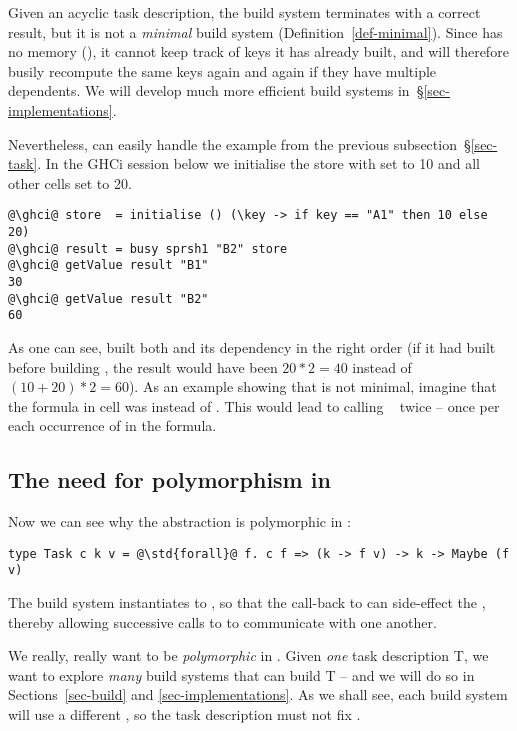 Given an acyclic task description, the  build system terminates with a
correct result, but it is not a \emph{minimal} build system
(Definition~\ref{def-minimal}). Since  has no memory (), it
cannot keep track of keys it has already built, and will therefore busily
recompute the same keys again and again if they have multiple dependents. We
will develop much more efficient build systems in~\S\ref{sec-implementations}.

Nevertheless,  can easily handle the example 
from the previous subsection~\S\ref{sec-task}. In the GHCi session below we
initialise the store with  set to 10 and all other cells set to 20.

\begin{verbatim}
@\ghci@ store  = initialise () (\key -> if key == "A1" then 10 else 20)
@\ghci@ result = busy sprsh1 "B2" store
@\ghci@ getValue result "B1"
30
@\ghci@ getValue result "B2"
60
\end{verbatim}

\noindent
As one can see,  built both  and its dependency  in the
right order (if it had built  before building , the result would
have been $20 * 2 = 40$ instead of $(10 + 20) * 2 = 60$). As an example showing
that  is not minimal, imagine that the formula in cell  was
 instead of . This would lead to calling
~ twice -- once per each occurrence of  in the
formula.

\subsection{The need for polymorphism in }

Now we can see why the  abstraction is polymorphic in :
\begin{verbatim}
type Task c k v = @\std{forall}@ f. c f => (k -> f v) -> k -> Maybe (f v)
\end{verbatim}
The  build system instantiates  to ,
so that the call-back to  can side-effect the ,
thereby allowing successive calls to  to communicate with one another.

We really, really want  to be \emph{polymorphic} in .
Given \emph{one} task description T, we want to explore \emph{many} build systems that
can build T -- and we will do so in Sections~\ref{sec-build} and \ref{sec-implementations}.
As we shall see, each build system will use a different , so the task description
must not fix .

